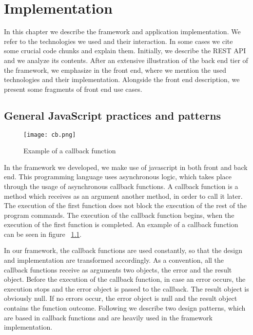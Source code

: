 
\chapter{Implementation}
\label{chapter5_i}
In this chapter we describe the framework and application implementation. We refer to the technologies we used and their interaction. In some cases we cite some crucial code chunks and explain them. Initially, we describe the REST API and we analyze its contents. After an extensive illustration of the back end tier of the framework, we emphasize in the front end, where we mention the used technologies and their implementation. Alongside the front end description, we present some fragments of front end use cases.

\section{General JavaScript practices and patterns}
\begin{figure}
	\centerline{\texttt{[image: cb.png]}}
	\caption{Example of a callback function}
	\label{cb}
\end{figure} 
In the framework we developed, we make use of javascript in both front and back end. This programming language uses asynchronous logic, which takes place through the usage of asynchronous callback functions. A callback function is a method which receives as an argument another method, in order to call it later. The execution of the first function does not block the execution of the rest of the program commands. The execution of the callback function begins, when the execution of the first function is completed. An example of a callback function can be seen in figure ~\ref{cb}. \par
	In our framework, the callback functions are used constantly, so that the design and implementation are transformed accordingly. As a convention, all the callback functions receive as arguments two objects, the error and the result object. Before the execution of the callback function, in case an error occurs, the execution stops and the error object is passed to the callback. The result object is obviously null. If no errors occur, the error object is null and the result object contains the function outcome. Following we describe two design patterns, which are based in callback functions and are heavily used in the framework implementation.

